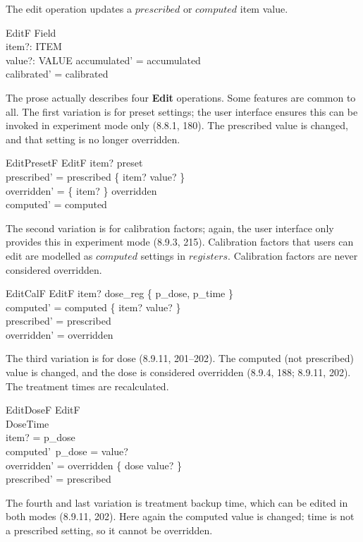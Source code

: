 The edit operation updates a $prescribed$ or $computed$ item value.

\begin{schema}{EditF}
	\Delta Field \\
	item?: ITEM \\
	value?: VALUE 
\where
	accumulated' = accumulated \\
	calibrated' = calibrated
\end{schema}
The prose actually describes four {\bf Edit} operations.  Some
features are common to all.  The first variation is for preset
settings; the user interface ensures this can be invoked in experiment
mode only (8.8.1, 180).  The prescribed value is changed, and that
setting is no longer overridden.

\begin{schema}{EditPresetF}
	EditF
\where
	item? \in preset \\
	prescribed' = prescribed \oplus \{ item? \mapsto value? \} \\
	overridden' = \{ item? \} \ndres overridden \\
\also
	computed' = computed \\
\end{schema}
The second variation is for calibration factors; again, the user
interface only provides this in experiment mode
(8.9.3, 215).  Calibration factors that users can edit are
modelled as $computed$ settings in $registers$.  Calibration factors
are never considered overridden.

\begin{schema}{EditCalF}
	EditF
\where
	item? \in dose\_reg \setminus \{ p\_dose, p\_time \} \\
	computed' = computed \oplus \{ item? \mapsto value? \} \\
\also
	prescribed' = prescribed \\
	overridden' = overridden
\end{schema}
The third variation is for dose (8.9.11, 201--202). The computed (not
prescribed) value is changed, and the dose is considered overridden
(8.9.4, 188; 8.9.11, 202).  The treatment times are recalculated.

\begin{schema}{EditDoseF}
	EditF \\
	DoseTime \\
\where
	item? = p\_dose \\
	computed'~p\_dose = value? \\
	overridden' = overridden \oplus \{ dose \mapsto value? \} \\
\also
	prescribed' = prescribed \\
\end{schema}
The fourth and last variation is treatment backup time, which can be
edited in both modes (8.9.11, 202). Here again the computed value is
changed; time is not a prescribed setting, so it cannot be
overridden.

